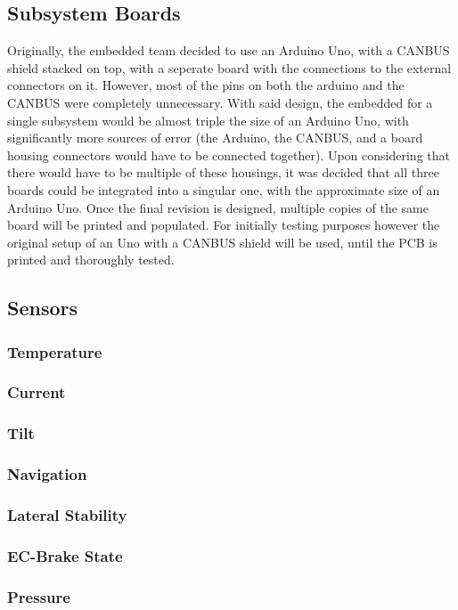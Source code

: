 \documentclass{report}
\begin{document}
    \subsection{Subsystem Boards}
    Originally, the embedded team decided to use an Arduino Uno, with a CANBUS shield stacked on top, with a seperate board with the connections to the external connectors on it. However, most of the pins on both the arduino and the CANBUS were completely unnecessary. With said design, the embedded for a single subsystem would be almost triple the size of an Arduino Uno, with significantly more sources of error (the Arduino, the CANBUS, and a board housing connectors would have to be connected together).  Upon considering that there would have to be multiple of these housings, it was decided that all three boards could be integrated into a singular one, with the approximate size of an Arduino Uno. Once the final revision is designed, multiple copies of the same board will be printed and populated. For initially testing purposes however the original setup of an Uno with a CANBUS shield will be used, until the PCB is printed and thoroughly tested. 
    
    \subsection{Sensors}
    \subsubsection{Temperature}
    \subsubsection{Current}
    \subsubsection{Tilt}
    \subsubsection{Navigation}
    \subsubsection{Lateral Stability}
    \subsubsection{EC-Brake State}
    \subsubsection{Pressure}
    
\end{document}

